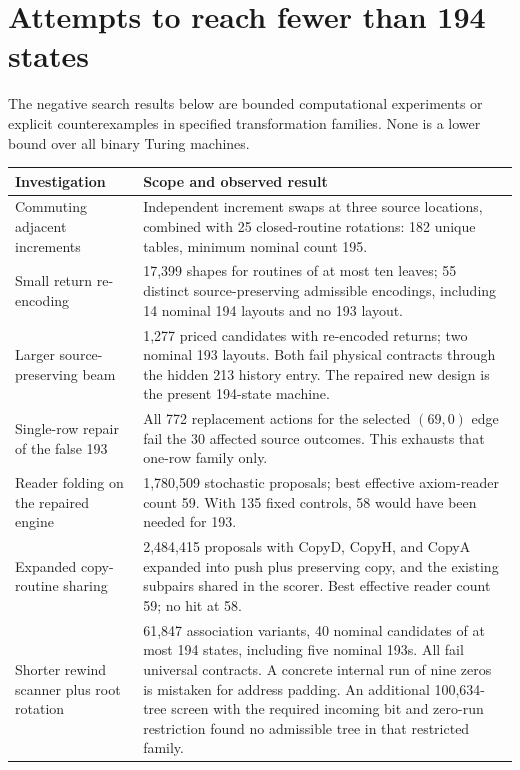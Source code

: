 \documentclass[11pt,a4paper]{article}
\theoremstyle{definition}
\begin{document}


\section{Attempts to reach fewer than 194 states}
\label{sec:search}

The negative search results below are bounded computational experiments
or explicit counterexamples in specified transformation families. None
is a lower bound over all binary Turing machines.

\begin{longtable}{p{}p{}}
\toprule
Investigation & Scope and observed result\\
\midrule\endhead
Commuting adjacent increments & Independent increment swaps at three
source locations, combined with 25 closed-routine rotations: 182 unique
tables, minimum nominal count 195.\\
Small return re-encoding & 17,399 shapes for routines of at most ten
leaves; 55 distinct source-preserving admissible encodings, including
14 nominal 194 layouts and no 193 layout.\\
Larger source-preserving beam & 1,277 priced candidates with re-encoded
returns; two nominal 193 layouts. Both fail physical contracts through
the hidden 213 history entry. The repaired new design is the present
194-state machine.\\
Single-row repair of the false 193 & All 772 replacement actions for
the selected $(69,0)$ edge fail the 30 affected source outcomes. This
exhausts that one-row family only.\\
Reader folding on the repaired engine & 1,780,509 stochastic proposals;
best effective axiom-reader count 59. With 135 fixed controls, 58 would
have been needed for 193.\\
Expanded copy-routine sharing & 2,484,415 proposals with CopyD, CopyH,
and CopyA expanded into push plus preserving copy, and the existing
subpairs shared in the scorer. Best effective reader count 59; no hit
at 58.\\
Shorter rewind scanner plus root rotation & 61,847 association variants,
40 nominal candidates of at most 194 states, including five nominal
193s. All fail universal contracts. A concrete internal run of nine
zeros is mistaken for address padding. An additional 100,634-tree
screen with the required incoming bit and zero-run restriction found
no admissible tree in that restricted family.\\
\bottomrule
\end{longtable}
\end{document}
